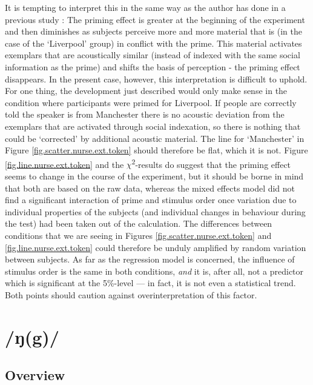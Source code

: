 It is tempting to interpret this in the same way as the author has done in a previous study \parencite[cf.][]{juskanma}: The priming effect is greater at the beginning of the experiment and then diminishes as subjects perceive more and more material that is (in the case of the `Liverpool' group) in conflict with the prime.
This material activates exemplars that are acoustically similar (instead of indexed with the same social information as the prime) and shifts the basis of perception - the priming effect disappears.
In the present case, however, this interpretation is difficult to uphold.
For one thing, the development just described would only make sense in the condition where participants were primed for Liverpool.
If people are correctly told the speaker is from Manchester there is no acoustic deviation from the exemplars that are activated through social indexation, so there is nothing that could be `corrected' by additional acoustic material.
The line for `Manchester' in Figure \ref{fig.scatter.nurse.ext.token} should therefore be flat, which it is not.
Figure \ref{fig.line.nurse.ext.token} and the \(\chi\)\textsuperscript{2}-results do suggest that the priming effect seems to change in the course of the experiment, but it should be borne in mind that both are based on the raw data, whereas the mixed effects model did not find a significant interaction of prime and stimulus order once variation due to individual properties of the subjects (and individual changes in behaviour during the test) had been taken out of the calculation.
The differences between conditions that we are seeing in Figures \ref{fig.scatter.nurse.ext.token} and \ref{fig.line.nurse.ext.token} could therefore be unduly amplified by random variation between subjects.
As far as the regression model is concerned, the influence of stimulus order is the same in both conditions, \emph{and} it is, after all, not a predictor which is significant at the 5\%-level --- in fact, it is not even a statistical trend.
Both points should caution against overinterpretation of this factor.


\section{/ŋ(g)/}
\label{sec.perc_res.ng}
	\subsection{Overview}
	\label{sec.perc_res.ng.overview}

